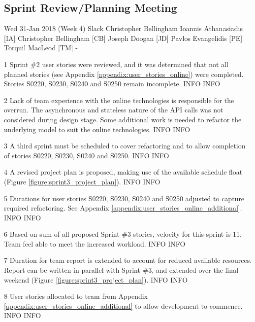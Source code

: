 \newpage
\subsection{Sprint Review/Planning Meeting}
\label{appendix:sprint3_planning_meeting}

\momtoptable
{Wed 31-Jan 2018 (Week 4)}
{Slack}
{Christopher Bellingham}
{Ioannis Athanasiadis [IA]\newline
Christopher Bellingham [CB]\newline
Joseph Doogan [JD]\newline
Pavlos Evangelidis [PE]\newline
Torquil MacLeod [TM]}
{-}

\begin{momitems}
	\momitem
	{1}
	{Sprint \#2 user stories were reviewed, and it was determined that not all planned stories (see Appendix \ref{appendix:user_stories_online}) were completed. Stories S0220, S0230, S0240 and S0250 remain incomplete.}
	{INFO}
	{INFO}

	\momitem
	{2}
	{Lack of team experience with the online technologies is responsible for the overrun. 
	The asynchronous and stateless nature of the API calls was not considered during design stage. Some additional work is needed to refactor the underlying model to suit the online technologies.}
	{INFO}
	{INFO}

	\momitem
	{3}
	{A third sprint must be scheduled to cover refactoring and to allow completion of stories S0220, S0230, S0240 and S0250.}
	{INFO}
	{INFO}

	\momitem
	{4}
	{A revised project plan is proposed, making use of the available schedule float (Figure \ref{figure:sprint3_project_plan}).}
	{INFO}
	{INFO}

	\momitem
	{5}
	{Durations for user stories S0220, S0230, S0240 and S0250 adjusted to capture required refactoring.
	See Appendix \ref{appendix:user_stories_online_additional}.}
	{INFO}
	{INFO}

	\momitem
	{6}
	{Based on sum of all proposed Sprint \#3 stories, velocity for this sprint is 11.
	Team feel able to meet the increased workload.}
	{INFO}
	{INFO}

	\momitem
	{7}
	{Duration for team report is extended to account for reduced available resources.
	Report can be written in parallel with Sprint \#3, and extended over the final weekend (Figure \ref{figure:sprint3_project_plan}).}
	{INFO}
	{INFO}

	\momitem
	{8}
	{User stories allocated to team from Appendix \ref{appendix:user_stories_online_additional} to allow development to commence.}
	{INFO}
	{INFO}
\end{momitems}

